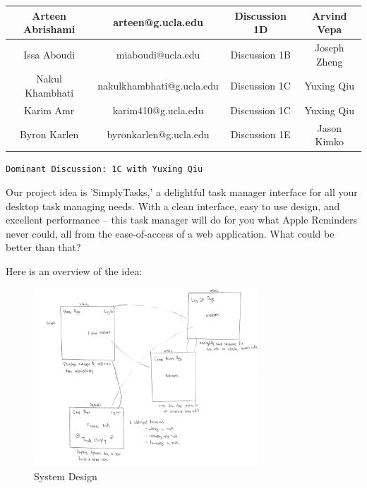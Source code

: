 \documentclass[10pt, letterpaper]{article}
\let\tab\quad
\begin{document}
\begin{table}
	\begin{tabular}{| c c c c |}
		
		\hline
		Arteen Abrishami & arteen@g.ucla.edu & Discussion 1D & Arvind Vepa \\
		\hline
		Issa Aboudi & miaboudi@ucla.edu & Discussion 1B & Joseph Zheng \\
		\hline
		Nakul Khambhati & nakulkhambhati@g.ucla.edu & Discussion 1C & Yuxing Qiu \\
		\hline
		Karim Amr & karim410@g.ucla.edu & Discussion 1C & Yuxing Qiu \\
		\hline
		Byron Karlen & byronkarlen@g.ucla.edu & Discussion 1E & Jason Kimko\\
		\hline
		
	\end{tabular}
\end{table}

\texttt{Dominant Discussion: 1C with Yuxing Qiu}

\tab Our project idea is 'SimplyTasks,' a delightful task manager interface for all your desktop task managing needs. With a clean interface, easy to use design, and excellent performance -- this task manager will do for you what Apple Reminders never could, all from the ease-of-access of a web application. What could be better than that?

\tab Here is an overview of the idea: 

\begin{figure}[h!]
	\begin{center}
		\includegraphics[width=0.75\textwidth]{illustration.png}
	\caption{System Design}
	\label{fig:design}
	\end{center}
\end{figure}
\end{document}
